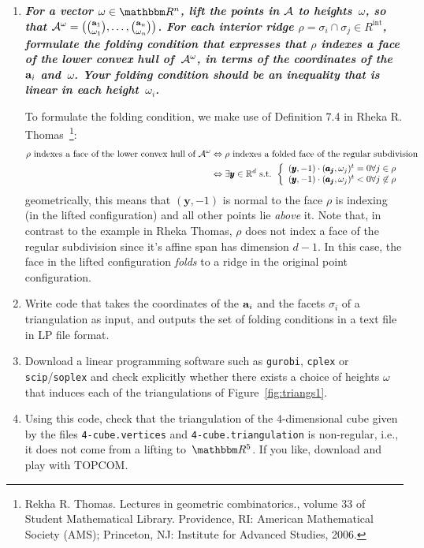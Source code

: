 \begin{enumerate}
  \item
      \textbf{\textit{For a vector $\omega\in\RR^n$, lift the points in $\mathcal{A}$ to heights~$\omega$, so that $\mathcal{A}^\omega=\big(\binom{\mathbf{a}_1}{\omega_1},\dots,\binom{\mathbf{a}_n}{\omega_n}\big)$. For each interior ridge $\rho=\sigma_i\cap\sigma_j\in R^{\text{int}}$, formulate the folding condition that expresses that $\rho$ indexes a face of the lower convex hull of~$\mathcal{A}^\omega$, in terms of the coordinates of the~$\mathbf{a}_i$ and~$\omega$. Your folding condition should be an inequality that is linear in each height~$\omega_i$.}}

To formulate the folding condition, we make use of Definition 7.4 in Rheka R. Thomas~\footnote{Rekha R. Thomas. Lectures in geometric combinatorics., volume 33 of Student Mathematical Library. Providence, RI: American Mathematical Society (AMS); Princeton, NJ: Institute for Advanced Studies, 2006.}:
        \begin{equation*}
            \begin{split}
                \rho \text{ indexes a face of the lower convex hull of } \mathcal{A}^\omega & \Leftrightarrow \rho \text{ indexes a folded face of the regular subdivision } \\
                & \Leftrightarrow \exists \pmb{y} \in \mathbb{R}^{d} \text{ s.t. } \left\lbrace \begin{array}{l} (\pmb{y}, -1) \cdot (\pmb{a_j}, \omega_j)^t = 0 \forall j \in \rho \\ (\pmb{y}, -1) \cdot (\pmb{a_j}, \omega_j)^t < 0 \forall j \not\in \rho \end{array} \right.
            \end{split}
        \end{equation*}
    geometrically, this means that $(\pmb{y}, -1)$ is normal to the face $\rho$ is indexing (in the lifted configuration) and all other points lie \textit{above} it.
    Note that, in contrast to the example in Rheka Thomas, $\rho$ does not index a face of the regular subdivision since it's affine span has dimension $d-1$. 
    In this case, the face in the lifted configuration \textit{folds} to a ridge in the original point configuration.

  \item
    Write code that takes the coordinates of the $\mathbf{a}_i$ and the facets $\sigma_i$ of a triangulation as input,
    and outputs the set of folding conditions in a text file in
    LP file format.

  \item
    Download a linear programming software such as
    \texttt{gurobi},
    \texttt{cplex} or
    \texttt{scip}/\texttt{soplex}
    and check explicitly whether there exists a choice of heights $\omega$ that induces each of the triangulations of Figure~\ref{fig:triangs1}.

  \item
    Using this code,
    check that the triangulation of the $4$-dimensional cube 
    given by the files \texttt{4-cube.vertices} and \texttt{4-cube.triangulation}
    is non-regular, i.e., it does not come from a lifting to~$\RR^5$.
    If you like, download and play with TOPCOM.
  \end{enumerate}

